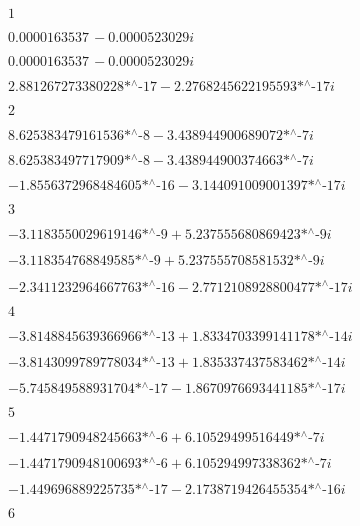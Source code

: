 \noindent\(1\)

\noindent\(0.0000163537\, -0.0000523029 i\)

\noindent\(0.0000163537\, -0.0000523029 i\)

\noindent\(\text{2.881267273380228$\grave{ }$*${}^{\wedge}$-17}-\text{2.2768245622195593$\grave{ }$*${}^{\wedge}$-17} i\)

\noindent\(2\)

\noindent\(\text{8.625383479161536$\grave{ }$*${}^{\wedge}$-8}-\text{3.438944900689072$\grave{ }$*${}^{\wedge}$-7} i\)

\noindent\(\text{8.625383497717909$\grave{ }$*${}^{\wedge}$-8}-\text{3.438944900374663$\grave{ }$*${}^{\wedge}$-7} i\)

\noindent\(-\text{1.8556372968484605$\grave{ }$*${}^{\wedge}$-16}-\text{3.144091009001397$\grave{ }$*${}^{\wedge}$-17} i\)

\noindent\(3\)

\noindent\(-\text{3.1183550029619146$\grave{ }$*${}^{\wedge}$-9}+\text{5.237555680869423$\grave{ }$*${}^{\wedge}$-9} i\)

\noindent\(-\text{3.118354768849585$\grave{ }$*${}^{\wedge}$-9}+\text{5.237555708581532$\grave{ }$*${}^{\wedge}$-9} i\)

\noindent\(-\text{2.3411232964667763$\grave{ }$*${}^{\wedge}$-16}-\text{2.7712108928800477$\grave{ }$*${}^{\wedge}$-17} i\)

\noindent\(4\)

\noindent\(-\text{3.8148845639366966$\grave{ }$*${}^{\wedge}$-13}+\text{1.8334703399141178$\grave{ }$*${}^{\wedge}$-14} i\)

\noindent\(-\text{3.8143099789778034$\grave{ }$*${}^{\wedge}$-13}+\text{1.835337437583462$\grave{ }$*${}^{\wedge}$-14} i\)

\noindent\(-\text{5.745849588931704$\grave{ }$*${}^{\wedge}$-17}-\text{1.8670976693441185$\grave{ }$*${}^{\wedge}$-17} i\)

\noindent\(5\)

\noindent\(-\text{1.4471790948245663$\grave{ }$*${}^{\wedge}$-6}+\text{6.10529499516449$\grave{ }$*${}^{\wedge}$-7} i\)

\noindent\(-\text{1.4471790948100693$\grave{ }$*${}^{\wedge}$-6}+\text{6.105294997338362$\grave{ }$*${}^{\wedge}$-7} i\)

\noindent\(-\text{1.449696889225735$\grave{ }$*${}^{\wedge}$-17}-\text{2.1738719426455354$\grave{ }$*${}^{\wedge}$-16} i\)

\noindent\(6\)

